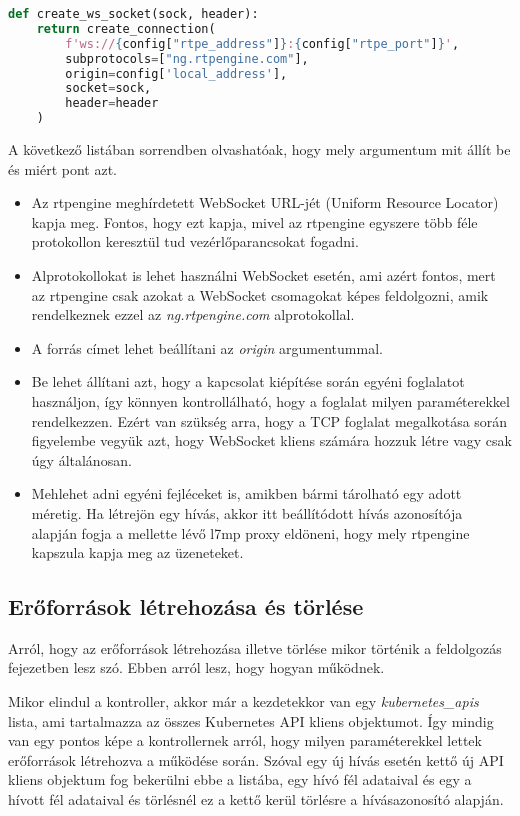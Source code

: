 \begin{lstlisting}[language=python]
def create_ws_socket(sock, header):
	return create_connection(
		f'ws://{config["rtpe_address"]}:{config["rtpe_port"]}',
		subprotocols=["ng.rtpengine.com"],
		origin=config['local_address'],
		socket=sock,
		header=header
	)
\end{lstlisting}

A következő listában sorrendben olvashatóak, hogy mely argumentum mit állít be és miért
pont azt.

\begin{itemize}
	\item Az rtpengine meghírdetett WebSocket URL-jét (Uniform Resource Locator) kapja 
	meg. Fontos, hogy ezt kapja, mivel az rtpengine egyszere több féle protokollon keresztül tud 
	vezérlőparancsokat fogadni.
	\item Alprotokollokat is lehet használni WebSocket esetén, ami azért fontos, mert
	az rtpengine csak azokat a WebSocket csomagokat képes feldolgozni, amik rendelkeznek
	ezzel az \textit{ng.rtpengine.com} alprotokollal.
	\item A forrás címet lehet beállítani az \textit{origin} argumentummal. 
	\item Be lehet állítani azt, hogy a kapcsolat kiépítése során egyéni foglalatot
	használjon, így könnyen kontrollálható, hogy a foglalat milyen paraméterekkel 
	rendelkezzen. Ezért van szükség arra, hogy a TCP foglalat megalkotása során
	figyelembe vegyük azt, hogy WebSocket kliens számára hozzuk létre vagy csak úgy
	általánosan.
	\item Mehlehet adni egyéni fejléceket is, amikben bármi tárolható egy adott
	méretig. Ha létrejön egy hívás, akkor itt beállítódott hívás azonosítója alapján
	fogja a mellette lévő l7mp proxy eldöneni, hogy mely rtpengine kapszula kapja
	meg az üzeneteket.
\end{itemize}

\subsection{Erőforrások létrehozása és törlése}

Arról, hogy az erőforrások létrehozása illetve törlése mikor történik a feldolgozás
fejezetben lesz szó. Ebben arról lesz, hogy hogyan működnek.

Mikor elindul a kontroller, akkor már a kezdetekkor van egy \textit{kubernetes\_apis}
lista, ami tartalmazza az összes Kubernetes API kliens objektumot. Így mindig van egy
pontos képe a kontrollernek arról, hogy milyen paraméterekkel lettek erőforrások 
létrehozva a működése során. Szóval egy új hívás esetén kettő új API kliens objektum 
fog bekerülni ebbe a listába, egy hívó fél adataival és egy a hívott fél adataival 
és törlésnél ez a kettő kerül törlésre a hívásazonosító alapján. 

